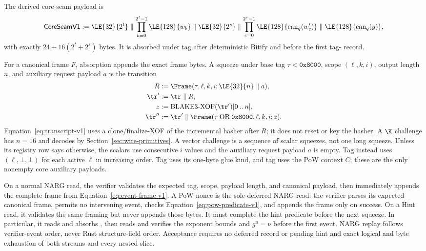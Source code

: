 The derived core-seam payload is
\begin{equation}
 \mathsf{CoreSeamV1}:=
  \LE{32}{2^t}\parallel\prod_{b=0}^{2^t-1}\LE{128}{w_b}
  \parallel\LE{32}{2^s}\parallel
    \prod_{c=0}^{2^s-1}\LE{128}{\operatorname{can}_q(w'_c)}
  \parallel\LE{128}{\operatorname{can}_q(y)},
 \label{eq:core-seam-payload}
\end{equation}
with exactly $24+16(2^t+2^s)$ bytes.  It is absorbed under tag 
after deterministic Bitify and before the first tag- record.

For a canonical frame $F$, absorption appends the exact frame bytes.  A
squeeze under base tag $\tau<\mathtt{0x8000}$, scope $(\ell,k,i)$, output
length $n$, and auxiliary request payload $a$ is the transition
\begin{equation}
 \begin{aligned}
  R&:=\Frame(\tau,\ell,k,i;\LE{32}{n}\parallel a),\\
  \tr'&:=\tr\parallel R,\\
  z&:=\operatorname{BLAKE3\text{-}XOF}(\tr')[0\mathbin{..}n],\\
  \tr''&:=\tr'\parallel
    \Frame(\tau\mathbin{\mathrm{OR}}\mathtt{0x8000},\ell,k,i;z).
 \end{aligned}
 \label{eq:transcript-v1}
\end{equation}
Equation~\eqref{eq:transcript-v1} uses a clone/finalize-XOF of the incremental
hasher after $R$; it does not reset or key the hasher.  A $\K$ challenge has
$n=16$ and decodes by Section~\ref{sec:wire-primitives}.  A vector challenge
is a sequence of scalar squeezes, not one long squeeze.  Unless its registry
row says otherwise, the scalars use consecutive $i$ values and the auxiliary
request payload $a$ is empty.  Tag  instead uses
$(\ell,\bot,\bot)$ for each active $\ell$ in increasing order.  Tag
 uses its one-byte glue kind, and tag  uses the PoW
context $C$; these are the only nonempty core auxiliary payloads.

On a normal NARG read, the verifier validates the expected tag, scope, payload
length, and canonical payload, then immediately appends the complete frame
from Equation~\eqref{eq:event-frame-v1}.  A PoW nonce is the sole deferred
NARG read: the verifier parses its expected canonical frame, permits no
intervening event, checks Equation~\eqref{eq:pow-predicate-v1}, and appends the
frame only on success.  On a Hint read, it validates the same framing but
never appends those bytes.  It must complete the hint predicate before the
next squeeze.  In particular, it reads and absorbs , then reads
 and verifies the exponent bounds and $g^u=\nu$ before the first
 event.  NARG replay follows verifier-event order, never Rust
structure-field order.  Acceptance requires no deferred record or pending
hint and exact logical and byte exhaustion of both streams and every nested
slice.

